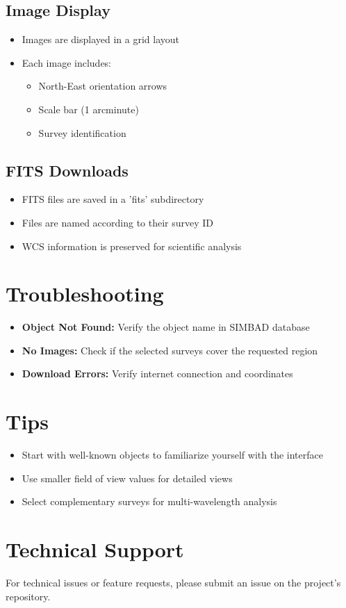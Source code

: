 \documentclass{article}
\begin{document}
\subsection{Image Display}
\begin{itemize}
    \item Images are displayed in a grid layout
    \item Each image includes:
        \begin{itemize}
            \item North-East orientation arrows
            \item Scale bar (1 arcminute)
            \item Survey identification
        \end{itemize}
\end{itemize}

\subsection{FITS Downloads}
\begin{itemize}
    \item FITS files are saved in a 'fits' subdirectory
    \item Files are named according to their survey ID
    \item WCS information is preserved for scientific analysis
\end{itemize}

\section{Troubleshooting}
\begin{itemize}
    \item \textbf{Object Not Found:} Verify the object name in SIMBAD database
    \item \textbf{No Images:} Check if the selected surveys cover the requested region
    \item \textbf{Download Errors:} Verify internet connection and coordinates
\end{itemize}

\section{Tips}
\begin{itemize}
    \item Start with well-known objects to familiarize yourself with the interface
    \item Use smaller field of view values for detailed views
    \item Select complementary surveys for multi-wavelength analysis
\end{itemize}

\section{Technical Support}
For technical issues or feature requests, please submit an issue on the project's repository.
\end{document}
